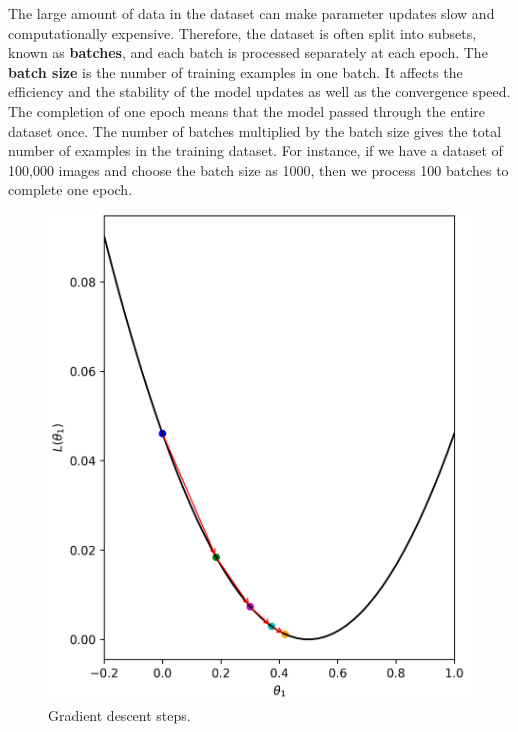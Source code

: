 The large amount of data in the dataset can make parameter updates slow and computationally expensive. Therefore, the dataset is often split into subsets, known as \textbf{batches}, and each batch is processed separately at each epoch. The \textbf{batch size} is the number of training examples in one batch. It affects the efficiency and the stability of the model updates as well as the convergence speed. The completion of one epoch means that the model passed through the entire dataset once. The number of batches multiplied by the batch size gives the total number of examples in the training dataset. For instance, if we have a dataset of 100,000 images and choose the batch size as 1000, then we process 100 batches to complete one epoch. 

\begin{figure}
  \centering
   \includegraphics[width=\linewidth]{Images/gradient-descent.png}
   \caption{Gradient descent steps.}
   \label{fig:gradient-descent}
\end{figure}
